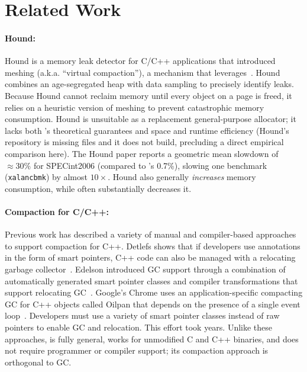 \section{Related Work}
\label{sec:related-work}

\paragraph*{Hound:}
\label{sec:hound}
Hound is a memory leak detector for C/C++ applications that introduced
meshing (a.k.a. ``virtual compaction''), a mechanism that \Mesh{}
leverages~\cite{1542521}. Hound combines an age-segregated heap with
data sampling to precisely identify leaks. Because Hound cannot
reclaim memory until every object on a page is freed, it relies on a
heuristic version of meshing to prevent catastrophic memory
consumption. Hound is unsuitable as a replacement general-purpose
allocator; it lacks both \Mesh's theoretical guarantees and space and
runtime efficiency (Hound's repository is missing files and it does
not build, precluding a direct empirical comparison here). The Hound
paper reports a geometric mean slowdown of $\approx 30\%$ for
SPECint2006 (compared to \Mesh{}'s 0.7\%), slowing one benchmark
(\texttt{xalancbmk}) by almost $10\times$. Hound also generally
\emph{increases} memory consumption, while \Mesh often substantially
decreases it.



\paragraph*{Compaction for C/C++:}
Previous work has described a variety of manual and compiler-based
approaches to support compaction for C++. Detlefs shows that if
developers use annotations in the form of smart pointers, C++ code can
also be managed with a relocating garbage
collector~\cite{detlefs:1992:gc}.  Edelson introduced GC support
through a combination of automatically generated smart pointer classes
and compiler transformations that support relocating
GC~\cite{edelson:1992:precompilingcgc}. Google's Chrome uses an
application-specific compacting GC for C++ objects called Oilpan that
depends on the presence of a single event
loop~\cite{google:oilpan}. Developers must use a variety of smart
pointer classes instead of raw pointers to enable GC and
relocation. This effort took years. Unlike these approaches, \Mesh is
fully general, works for unmodified C and C++ binaries, and does not
require programmer or compiler support; its compaction approach is
orthogonal to GC.

